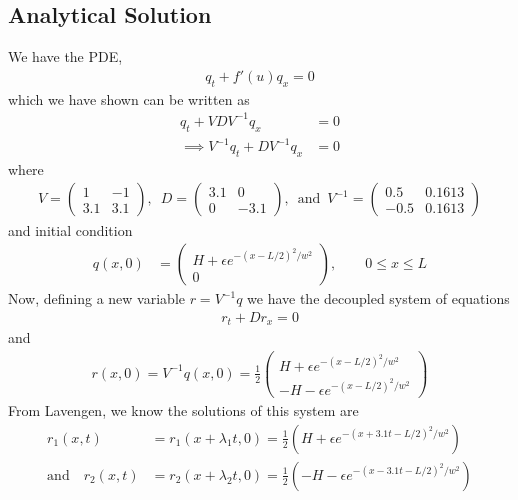 \subsection{Analytical Solution}
We have the PDE, 
\begin{align*}
q_t + f'(u) q_x = 0
\end{align*}
which we have shown can be written as 
\begin{align*}
q_t + V D V^{-1} q_x &= 0 \\
\implies V^{-1} q_t + D V^{-1} q_x &= 0
\end{align*}
where 
\begin{align*}
 V = \begin{pmatrix}
1 & -1 \\
3.1 & 3.1
\end{pmatrix}, \enspace D= \begin{pmatrix}
3.1 & 0 \\
0 & -3.1
\end{pmatrix},  \enspace \text{and} \enspace V^{-1} = \begin{pmatrix}
0.5 & 0.1613 \\
-0.5 & 0.1613
\end{pmatrix}
\end{align*} and initial condition
\begin{align*}
q(x,0) &= \begin{pmatrix}
H + \epsilon e^{-(x-L/2)^2/w^2} \\
0
\end{pmatrix}, \quad \quad 0 \leq x \leq L
\end{align*}
Now, defining a new variable $r = V^{-1} q$ we have the decoupled system of equations
\begin{align*}
r_t + Dr_x = 0
\end{align*}
and 
\begin{align*}
r(x,0) = V^{-1} q(x,0) = \frac{1}{2} \begin{pmatrix}
H + \epsilon e^{-(x-L/2)^2/w^2} \\
-H - \epsilon e^{-(x-L/2)^2/w^2}
\end{pmatrix} 
\end{align*}
From Lavengen, we know the solutions of this system are 
\begin{align*}
	r_1(x,t)&=r_1(x+\lambda_1t,0)=\frac{1}{2} (H + \epsilon e^{-(x+3.1t-L/2)^2/w^2}) \\
	\text{and} \quad r_2(x,t)&=r_2(x+\lambda_2t,0)= \frac{1}{2}(-H - \epsilon e^{-(x-3.1t-L/2)^2/w^2})
\end{align*} 
